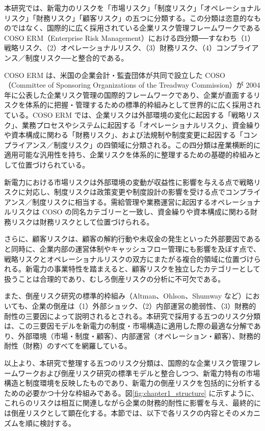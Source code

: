 本研究では、新電力のリスクを「市場リスク」「制度リスク」「オペレーショナルリスク」「財務リスク」「顧客リスク」の五つに分類する。この分類は恣意的なものではなく、国際的に広く採用されている企業リスク管理フレームワークである COSO ERM（Enterprise Risk Management）における四分類──すなわち（1）戦略リスク、（2）オペレーショナルリスク、（3）財務リスク、（4）コンプライアンス／制度リスク──と整合的である。

COSO ERM は、米国の企業会計・監査団体が共同で設立した COSO（Committee of Sponsoring Organizations of the Treadway Commission）が 2004 年に公表した企業リスク管理の国際的フレームワークであり、企業が直面するリスクを体系的に把握・管理するための標準的枠組みとして世界的に広く採用されている。COSO ERM では、企業リスクは外部環境の変化に起因する「戦略リスク」、業務プロセスやシステムに起因する「オペレーショナルリスク」、資金繰りや資本構成に関わる「財務リスク」、および法規制や制度変更に起因する「コンプライアンス／制度リスク」の四領域に分類される。この四分類は産業横断的に適用可能な汎用性を持ち、企業リスクを体系的に整理するための基礎的枠組みとして位置づけられている。

新電力における市場リスクは外部環境の変動が収益性に影響を与える点で戦略リスクに対応し、制度リスクは政策変更や制度設計の影響を受ける点でコンプライアンス／制度リスクに相当する。需給管理や業務運営に起因するオペレーショナルリスクは COSO の同名カテゴリーと一致し、資金繰りや資本構成に関わる財務リスクは財務リスクとして位置づけられる。

さらに、顧客リスクは、顧客の解約行動や未収金の発生といった外部要因であると同時に、企業内部の運営体制やキャッシュフロー管理にも影響を及ぼす点で、戦略リスクとオペレーショナルリスクの双方にまたがる複合的領域に位置づけられる。新電力の事業特性を踏まえると、顧客リスクを独立したカテゴリーとして扱うことは合理的であり、むしろ倒産リスクの分析に不可欠である。

また、倒産リスク研究の標準的枠組み（Altman、Ohlson、Shumway など）においても、企業の倒産は（1）外部ショック、（2）内部運営の脆弱性、（3）財務的耐性の三要因によって説明されるとされる。本研究で採用する五つのリスク分類は、この三要因モデルを新電力の制度・市場構造に適用した際の最適な分解であり、外部環境（市場・制度・顧客）、内部運営（オペレーション・顧客）、財務的耐性（財務）のすべてを網羅している。

以上より、本研究で整理する五つのリスク分類は、国際的な企業リスク管理フレームワークおよび倒産リスク研究の標準モデルと整合しつつ、新電力特有の市場構造と制度環境を反映したものであり、新電力の倒産リスクを包括的に分析するための必要かつ十分な枠組みである。図\ref{fig:chapter1_structure} に示すように、これらのリスクは相互に関連しながら企業の財務的耐性に影響を与え、最終的には倒産リスクとして顕在化する。本節では、以下で各リスクの内容とそのメカニズムを順に検討する。

